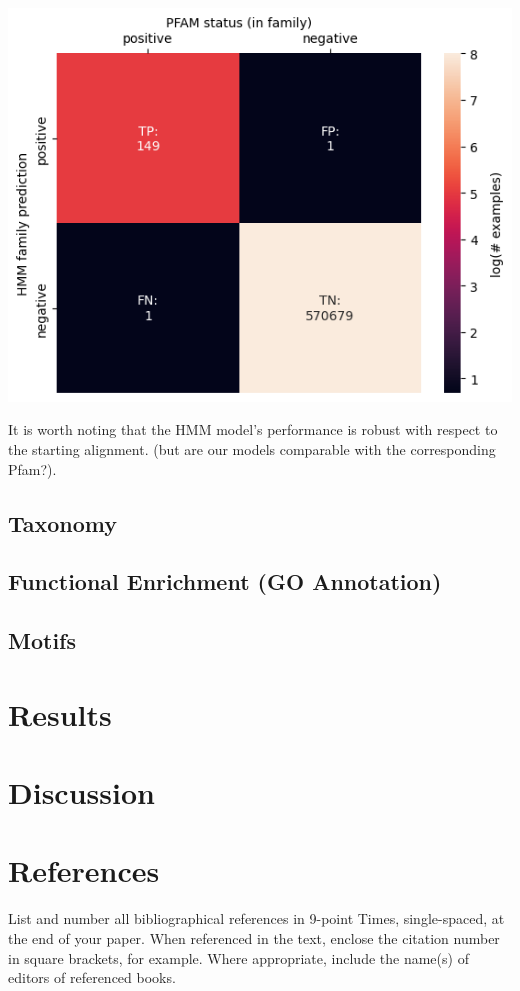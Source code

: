 \documentclass[10pt,twocolumn,letterpaper]{article}
\begin{document}
\begin{center}
    \includegraphics[scale=0.4]{img/hmm_eval.png}
\end{center}

It is worth noting that the HMM model's performance is robust with respect to the starting alignment. (but are our models comparable with the corresponding Pfam?).\\

\subsection{Taxonomy}

\subsection{Functional Enrichment (GO Annotation)}

\subsection{Motifs}



\section{Results}

\section{Discussion}




\section{References}

List and number all bibliographical references in 9-point Times,
single-spaced, at the end of your paper. When referenced in the text,
enclose the citation number in square brackets, for
example.  Where appropriate, include the name(s) of
editors of referenced books.

%
%
\end{document}
